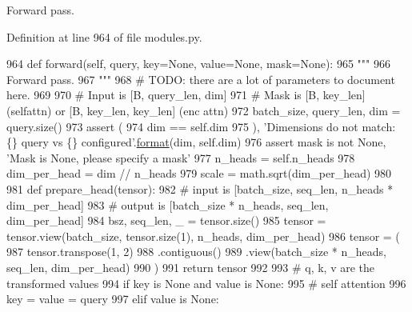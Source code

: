 \begin{DoxyVerb}Forward pass.
\end{DoxyVerb}
 

Definition at line 964 of file modules.\+py.


\begin{DoxyCode}
964     \textcolor{keyword}{def }forward(self, query, key=None, value=None, mask=None):
965         \textcolor{stringliteral}{"""}
966 \textcolor{stringliteral}{        Forward pass.}
967 \textcolor{stringliteral}{        """}
968         \textcolor{comment}{# TODO: there are a lot of parameters to document here.}
969 
970         \textcolor{comment}{# Input is [B, query\_len, dim]}
971         \textcolor{comment}{# Mask is [B, key\_len] (selfattn) or [B, key\_len, key\_len] (enc attn)}
972         batch\_size, query\_len, dim = query.size()
973         \textcolor{keyword}{assert} (
974             dim == self.dim
975         ), \textcolor{stringliteral}{'Dimensions do not match: \{\} query vs \{\} configured'}.\hyperlink{namespaceparlai_1_1chat__service_1_1services_1_1messenger_1_1shared__utils_a32e2e2022b824fbaf80c747160b52a76}{format}(dim, self.dim)
976         \textcolor{keyword}{assert} mask \textcolor{keywordflow}{is} \textcolor{keywordflow}{not} \textcolor{keywordtype}{None}, \textcolor{stringliteral}{'Mask is None, please specify a mask'}
977         n\_heads = self.n\_heads
978         dim\_per\_head = dim // n\_heads
979         scale = math.sqrt(dim\_per\_head)
980 
981         \textcolor{keyword}{def }prepare\_head(tensor):
982             \textcolor{comment}{# input is [batch\_size, seq\_len, n\_heads * dim\_per\_head]}
983             \textcolor{comment}{# output is [batch\_size * n\_heads, seq\_len, dim\_per\_head]}
984             bsz, seq\_len, \_ = tensor.size()
985             tensor = tensor.view(batch\_size, tensor.size(1), n\_heads, dim\_per\_head)
986             tensor = (
987                 tensor.transpose(1, 2)
988                 .contiguous()
989                 .view(batch\_size * n\_heads, seq\_len, dim\_per\_head)
990             )
991             \textcolor{keywordflow}{return} tensor
992 
993         \textcolor{comment}{# q, k, v are the transformed values}
994         \textcolor{keywordflow}{if} key \textcolor{keywordflow}{is} \textcolor{keywordtype}{None} \textcolor{keywordflow}{and} value \textcolor{keywordflow}{is} \textcolor{keywordtype}{None}:
995             \textcolor{comment}{# self attention}
996             key = value = query
997         \textcolor{keywordflow}{elif} value \textcolor{keywordflow}{is} \textcolor{keywordtype}{None}:

\end{DoxyCode}
